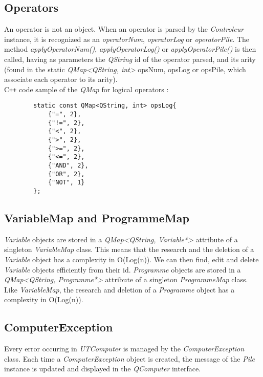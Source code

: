 \documentclass[titlepage]{article}
\begin{document}
    \subsection{Operators}

    An operator is not an object. When an operator is parsed by the \textit{Controleur} instance, it is recognized as an \textit{operatorNum}, \textit{operatorLog} or \textit{operatorPile}. The method \textit{applyOperatorNum()}, \textit{applyOperatorLog()} or \textit{applyOperatorPile()} is then called, having as parameters the \textit{QString} id of the operator parsed, and its arity (found in the static \textit{QMap<QString, int>} opsNum, opsLog or opsPile, which associate each operator to its arity).\\

    C\texttt{++} code sample of the \textit{QMap} for logical operators :
    \begin{lstlisting}
        static const QMap<QString, int> opsLog{
            {"=", 2},
            {"!=", 2},
            {"<", 2},
            {">", 2},
            {">=", 2},
            {"<=", 2},
            {"AND", 2},
            {"OR", 2},
            {"NOT", 1}
        };
    \end{lstlisting}

    \subsection{VariableMap and ProgrammeMap}

    \textit{Variable} objects are stored in a \textit{QMap<QString, Variable*>} attribute of a singleton \textit{VariableMap} class. This means that the research and the deletion of a \textit{Variable} object has a complexity in O(Log(n)). We can then find, edit and delete \textit{Variable} objects efficiently from their id.
    \textit{Programme} objects are stored in a \textit{QMap<QString, Programme*>} attribute of a singleton \textit{ProgrammeMap} class. Like \textit{VariableMap}, the research and deletion of a \textit{Programme} object has a complexity in O(Log(n)).

    \subsection{ComputerException}

    Every error occuring in \textit{UTComputer} is managed by the \textit{ComputerException} class. Each time a \textit{ComputerException} object is created, the message of the \textit{Pile} instance is updated and displayed in the \textit{QComputer} interface.
\end{document}
